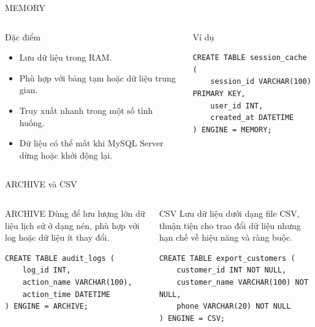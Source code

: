 \documentclass[aspectratio=169,11pt]{beamer}
\newcommand{\smallitem}{\setlength{\itemsep}{2pt}}
\begin{document}
\begin{frame}[fragile]{MEMORY}
\begin{columns}[T,onlytextwidth]
\begin{block}{Đặc điểm}
\begin{itemize}\smallitem
  \item Lưu dữ liệu trong RAM.
  \item Phù hợp với bảng tạm hoặc dữ liệu trung gian.
  \item Truy xuất nhanh trong một số tình huống.
  \item Dữ liệu có thể mất khi MySQL Server dừng hoặc khởi động lại.
\end{itemize}
\end{block}
\begin{block}{Ví dụ}
\begin{lstlisting}
CREATE TABLE session_cache (
    session_id VARCHAR(100) PRIMARY KEY,
    user_id INT,
    created_at DATETIME
) ENGINE = MEMORY;
\end{lstlisting}
\end{block}
\end{columns}
\end{frame}

\begin{frame}[fragile]{ARCHIVE và CSV}
\begin{columns}[T,onlytextwidth]
\begin{block}{ARCHIVE}
\small Dùng để lưu lượng lớn dữ liệu lịch sử ở dạng nén, phù hợp với log hoặc dữ liệu ít thay đổi.
\begin{lstlisting}
CREATE TABLE audit_logs (
    log_id INT,
    action_name VARCHAR(100),
    action_time DATETIME
) ENGINE = ARCHIVE;
\end{lstlisting}
\end{block}
\begin{block}{CSV}
\small Lưu dữ liệu dưới dạng file CSV, thuận tiện cho trao đổi dữ liệu nhưng hạn chế về hiệu năng và ràng buộc.
\begin{lstlisting}
CREATE TABLE export_customers (
    customer_id INT NOT NULL,
    customer_name VARCHAR(100) NOT NULL,
    phone VARCHAR(20) NOT NULL
) ENGINE = CSV;
\end{lstlisting}
\end{block}
\end{columns}
\end{frame}
\end{document}
